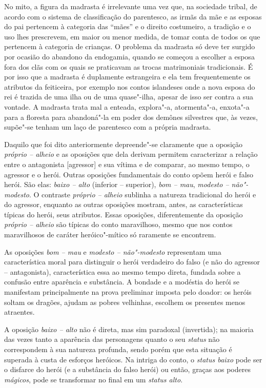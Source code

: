 No mito, a figura da madrasta é irrelevante uma vez que, na sociedade
tribal, de acordo com o sistema de classificação do parentesco, as irmãs
da mãe e as esposas do pai pertencem à categoria das ``mães'' e o
direito costumeiro, a tradição e o uso lhes prescrevem, em maior ou
menor medida, de tomar conta de todos os que pertencem à categoria de
crianças. O problema da madrasta só deve ter surgido por ocasião do
abandono da endogamia, quando se começou a escolher a esposa fora dos
clãs com os quais se praticavam as trocas matrimoniais tradicionais. É
por isso que a madrasta é duplamente estrangeira e ela tem
frequentemente os atributos da feiticeira, por exemplo nos contos
islandeses onde a nova esposa do rei é trazida de uma ilha ou de uma
quase"-ilha, apesar de isso ser contra a sua vontade. A madrasta trata
mal a enteada, explora"-a, atormenta"-a, enxota"-a para a floresta para
abandoná"-la em poder dos demônes silvestres que, às vezes, supõe"-se
tenham um laço de parentesco com a própria madrasta.

Daquilo que foi dito anteriormente depreende"-se claramente que a
oposição \emph{próprio -- alheio} e as oposições que dela derivam permitem
caracterizar a relação entre o antagonista [agressor] e sua vítima e
de comparar, ao mesmo tempo, o agressor e o herói. Outras oposições
fundamentais do conto opõem herói e falso herói. São elas: \emph{baixo --
alto} (inferior -- superior), \emph{bom -- mau}, \emph{modesto -- não"-modesto}. O
contraste \emph{próprio -- alheio} sublinha a natureza tradicional do herói e
do agressor, enquanto as outras oposições mostram, antes, as
características típicas do herói, seus atributos. Essas oposições,
diferentemente da oposição \emph{próprio -- alheio} são típicas do conto
maravilhoso, mesmo que nos contos maravilhosos de caráter heróico"-mítico
só raramente se encontrem.

As oposições \emph{bom -- mau} e \emph{modesto -- não"-modesto} representam uma
característica moral para distinguir o herói verdadeiro do falso (e não
do agressor -- antagonista), característica essa ao mesmo tempo direta,
fundada sobre a confusão entre aparência e substância. A bondade e a
modéstia do herói se manifestam principalmente na prova preliminar
imposta pelo doador: os heróis soltam os dragões, ajudam as pobres
velhinhas, escolhem os presentes menos atraentes.

A oposição \emph{baixo -- alto} não é direta, mas sim paradoxal (invertida);
na maioria das vezes tanto a aparência das personagens quanto o
seu \emph{status} não correspondem à sua natureza profunda, sendo porém que
esta situação é superada à custa de esforços heróicos. Na intriga do
conto, o \emph{status baixo} pode ser o disfarce do herói (e a substância
do falso herói) ou então, graças aos poderes \emph{mágicos}, pode se
transformar no final em um \emph{status alto}.

